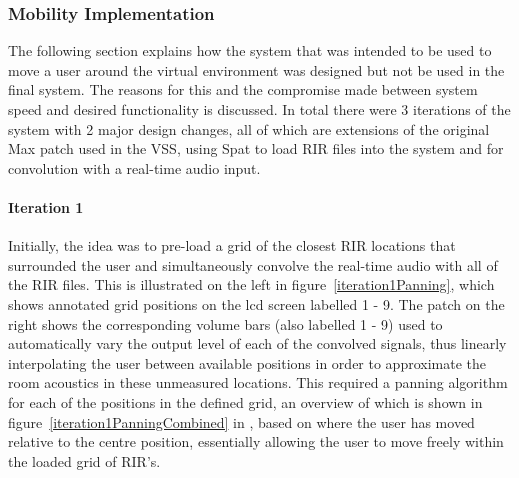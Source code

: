 \documentclass[../../main.tex]{subfiles}
\begin{document}
		\subsubsection{Mobility Implementation}


		The following section explains how the system that was intended to be used to move a user around the virtual environment was designed but not be used in the final system. The reasons for this and the compromise made between system speed and desired functionality is discussed. In total there were 3 iterations of the system with 2 major design changes, all of which are extensions of the original Max patch used in the \ac{VSS}, using Spat to load \ac{RIR} files into the system and for convolution with a real-time audio input.

		 \paragraph{Iteration 1}
		 \label{iteration1}

		 	Initially, the idea was to pre-load a grid of the closest \ac{RIR} locations that surrounded the user and simultaneously convolve the real-time audio with all of the \ac{RIR} files. This is illustrated on the left in figure~\ref{iteration1Panning}, which shows annotated grid positions on the lcd screen labelled 1 - 9. The patch on the right shows the corresponding volume bars (also labelled 1 - 9) used to automatically vary the output level of each of the convolved signals, thus linearly interpolating the user between available positions in order to approximate the room acoustics in these unmeasured locations. This required a panning algorithm for each of the positions in the defined grid, an overview of which is shown in figure~\ref{iteration1PanningCombined} in , based on where the user has moved relative to the centre position, essentially allowing the user to move freely within the loaded grid of \ac{RIR}'s.
\end{document}
